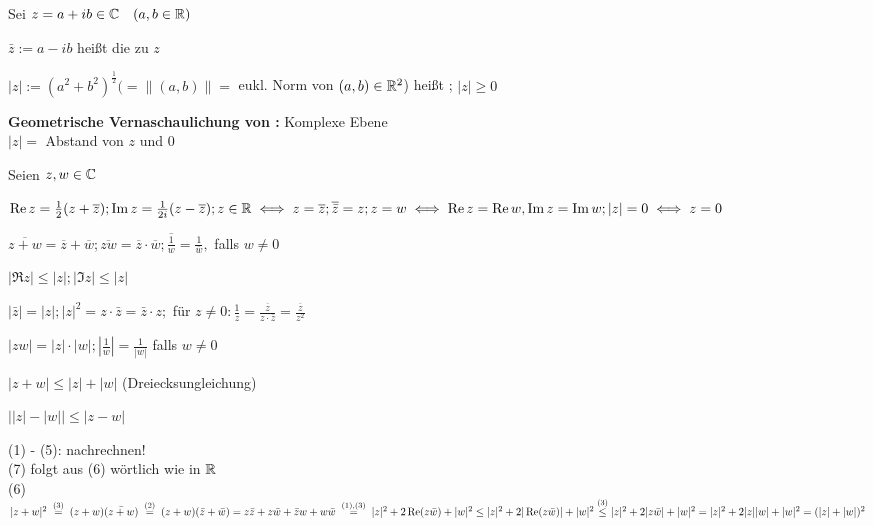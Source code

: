 \documentclass[a4paper,twoside,DIV15,BCOR12mm]{scrbook}
\begin{document}
\begin{definition}
Sei $z = a + ib \in \mathbb{C} \quad (a,b \in \mathbb{R})$\\
\begin{liste}
\item $\bar z := a - ib$ heißt die zu $z$  \\
\item $|z| := (a^2 + b^2)^{\frac{1}{2}} (=\|(a,b)\| =$ eukl. Norm von $(a,b) \in \mathbb{R} ^2$) heißt ; $|z|\geq 0$
\end{liste}
\textbf{Geometrische Vernaschaulichung von \MdC :} Komplexe Ebene \\
$|z| =$ Abstand von $z$ und $0$
\end{definition}

\begin{satz}
Seien $z,w \in \mathbb{C}$\\
\begin{liste}
\item $\mathop{\rm Re}\nolimits z = \frac{1}{2}(z + \overline{z}); \mathop{\rm Im}\nolimits z = \frac{1}{2 i}(z-\overline{z}); z \in \mathbb{R} \iff z = \overline{z}; \overline{\bar z}=z; z=w \iff \mathop{\rm Re}\nolimits z = \mathop{\rm Re}\nolimits w, \mathop{\rm Im}\nolimits z = \mathop{\rm Im}\nolimits w; |z|=0 \iff z=0$
\item $\overline{z+w} = \overline{z} + \overline{w}; \overline{zw} = \overline{z} \cdot \overline{w}; \overline{\frac{1}{w}} = \frac{1}{\bar w}, $ falls $w \neq 0$
\item $| \Re z| \leq |z|; |\Im z| \leq |z|$
\item $|\bar z| = |z|; |z|^2 = z\cdot \bar z = \bar z \cdot z;$ für $z \neq 0 : \frac{1}{z} = \frac{\overline{z}}{z \cdot \overline{z}} = \frac{\overline{z} }{z^2}$
\item $|zw| = |z|\cdot |w|; |\frac{1}{w}| = \frac{1}{|w|}$ falls $w \neq 0$
\item $|z + w| \leq |z| + |w|$ \quad (Dreiecksungleichung)
\item $\big ||z|-|w|\big| \leq |z - w|$
\end{liste}
\end{satz}

\begin{beweis}
(1) - (5): nachrechnen! \\
(7) folgt aus (6) wörtlich wie in $\mathbb{R}$ \\
(6) $|z + w|^2 \gleichwegen{(3)} (z + w)(\bar {z+w}) \gleichwegen{(2)} (z+w)(\bar z + \bar w) = z \bar z + z \bar w + \bar z w + w \bar w \\
\gleichwegen{(1),(3)} |z| ^2 + 2\Re(z \bar w) + |w|^2 \leq |z|^2 + 2|\Re (z\bar w)| + |w|^2 \\
\stackrel{(3)}{\leq} |z|^2 + 2|z\bar w| + |w|^2 = |z|^2 + 2|z||w| + |w|^2 = (|z| + |w|)^2$
\end{beweis}
\end{document}
